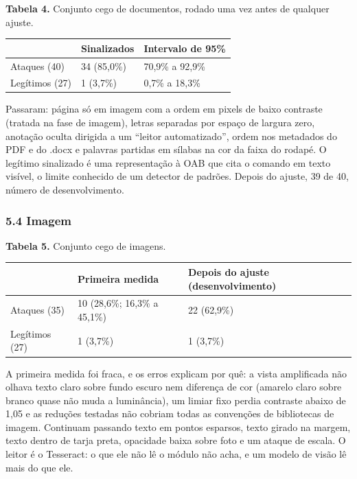 \documentclass[
  brazilian,
  11pt,
]{article}
\newcounter{none} %
\begin{document}
\textbf{Tabela 4.} Conjunto cego de documentos, rodado uma vez antes de
qualquer ajuste.

{\def\LTcaptype{none} %
\begin{longtable}[]{@{}lll@{}}
\toprule\noalign{}
& Sinalizados & Intervalo de 95\% \\
\midrule\noalign{}
\endhead
\bottomrule\noalign{}
\endlastfoot
Ataques (40) & 34 (85,0\%) & 70,9\% a 92,9\% \\
Legítimos (27) & 1 (3,7\%) & 0,7\% a 18,3\% \\
\end{longtable}
}

Passaram: página só em imagem com a ordem em pixels de baixo contraste
(tratada na fase de imagem), letras separadas por espaço de largura
zero, anotação oculta dirigida a um ``leitor automatizado'', ordem nos
metadados do PDF e do .docx e palavras partidas em sílabas na cor da
faixa do rodapé. O legítimo sinalizado é uma representação à OAB que
cita o comando em texto visível, o limite conhecido de um detector de
padrões. Depois do ajuste, 39 de 40, número de desenvolvimento.

\subsubsection{5.4 Imagem}\label{imagem}

\textbf{Tabela 5.} Conjunto cego de imagens.

{\def\LTcaptype{none} %
\begin{longtable}[]{@{}lll@{}}
\toprule\noalign{}
& Primeira medida & Depois do ajuste (desenvolvimento) \\
\midrule\noalign{}
\endhead
\bottomrule\noalign{}
\endlastfoot
Ataques (35) & 10 (28,6\%; 16,3\% a 45,1\%) & 22 (62,9\%) \\
Legítimos (27) & 1 (3,7\%) & 1 (3,7\%) \\
\end{longtable}
}

A primeira medida foi fraca, e os erros explicam por quê: a vista
amplificada não olhava texto claro sobre fundo escuro nem diferença de
cor (amarelo claro sobre branco quase não muda a luminância), um limiar
fixo perdia contraste abaixo de 1,05 e as reduções testadas não cobriam
todas as convenções de bibliotecas de imagem. Continuam passando texto
em pontos esparsos, texto girado na margem, texto dentro de tarja preta,
opacidade baixa sobre foto e um ataque de escala. O leitor é o
Tesseract: o que ele não lê o módulo não acha, e um modelo de visão lê
mais do que ele.
\end{document}
